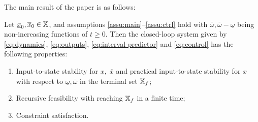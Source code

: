 \documentclass[letterpaper, 10 pt, conference]{ieeeconf}  %
\begin{document}
The main result of the paper is as follows:
\begin{theorem}
\label{th:MPC} Let $\underline{x}_{0},\overline{x}_{0}\in\mathbb{X}$, and
assumptions \ref{assu:main}--\ref{assu:ctrl} hold with $\overline{\omega},\overline{\omega}-\underline{\omega}$
being non-increasing functions of $t\geq0$. Then the closed-loop
system given by \eqref{eq:dynamics}, \eqref{eq:outputs}, \eqref{eq:interval-predictor}
and \eqref{eq:control} has the following properties:
\begin{enumerate}
\item Input-to-state stability for $\underline{x},\;\overline{x}$ and practical
input-to-state stability for $x$ with respect to $\underline{\omega},\overline{\omega}$
in the terminal set $\mathbb{X}_{f}$; 
\item Recursive feasibility with reaching $\mathbb{X}_{f}$ in a finite time; 
\item Constraint satisfaction.
\end{enumerate}
\end{theorem}
\end{document}
